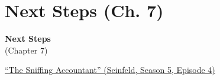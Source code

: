 \documentclass[aspectratio=169, 9pt]{beamer}
\begin{document}
\section{Next Steps (Ch. 7)}

\begin{frame}[t]
	\textcolor{uscgold}{
		\Large {\bf Next Steps} \\
		(\small Chapter 7\Large)
	}
\end{frame}

\begin{frame}[c]
	\centering
	
	\pause
	\vfill\raggedright {\footnotesize \href{https://en.wikipedia.org/wiki/The_Sniffing_Accountant}{``The Sniffing Accountant'' (Seinfeld, Season 5, Episode 4)}}
\end{frame}
\end{document}
